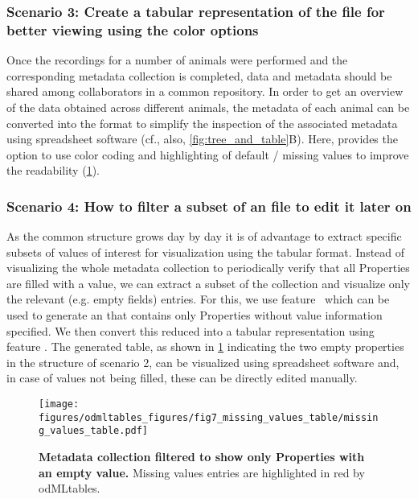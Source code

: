 \subsubsection*{Scenario 3: Create a tabular representation of the  file for better viewing using the color options}
Once the recordings for a number of animals were performed and the corresponding metadata collection is completed, data and metadata should be shared among collaborators in a common repository. In order to get an overview of the data obtained across different animals, the metadata of each animal can be converted into the  format to simplify the inspection of the associated metadata using spreadsheet software (cf., also, \cref{fig:tree_and_table}B). Here,  provides the option to use color coding and highlighting of default / missing values to improve the readability (\cref{fig:missing_values_table}).

\subsubsection*{Scenario 4: How to filter a subset of an  file to edit it later on}
As the common  structure grows day by day it is of advantage to extract specific subsets of  values of interest for visualization using the tabular format. Instead of visualizing the whole metadata collection to periodically verify that all Properties are filled with a value, we can extract a subset of the collection and visualize only the relevant (e.g. empty fields) entries. For this, we use  feature \ffilter\ which can be used to generate an  that contains only Properties without value information specified. We then convert this reduced  into a tabular  representation using  feature \fconvert. The generated table, as shown in \cref{fig:missing_values_table} indicating the two empty properties in the  structure of scenario 2, can be visualized using spreadsheet software and, in case of values not being filled, these can be directly edited manually.

\begin{figure}[!ht]
\begin{center}
\texttt{[image: figures/odmltables\_figures/fig7\_missing\_values\_table/missing\_values\_table.pdf]}
\caption[Metadata collection filtered to show only Properties with an empty value]{\label{fig:missing_values_table}
\textbf{Metadata collection filtered to show only Properties with an empty value.} Missing values entries are highlighted in red by odMLtables.}
\end{center}
\end{figure}

